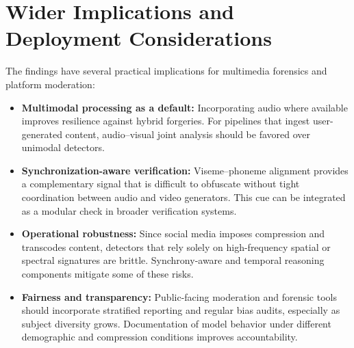 \section{Wider Implications and Deployment Considerations}
The findings have several practical implications for multimedia forensics and platform moderation:
\begin{itemize}
    \item \textbf{Multimodal processing as a default:} Incorporating audio where available improves resilience against hybrid forgeries. For pipelines that ingest user-generated content, audio--visual joint analysis should be favored over unimodal detectors.
    \item \textbf{Synchronization-aware verification:} Viseme--phoneme alignment provides a complementary signal that is difficult to obfuscate without tight coordination between audio and video generators. This cue can be integrated as a modular check in broader verification systems.
    \item \textbf{Operational robustness:} Since social media imposes compression and transcodes content, detectors that rely solely on high-frequency spatial or spectral signatures are brittle. Synchrony-aware and temporal reasoning components mitigate some of these risks.
    \item \textbf{Fairness and transparency:} Public-facing moderation and forensic tools should incorporate stratified reporting and regular bias audits, especially as subject diversity grows. Documentation of model behavior under different demographic and compression conditions improves accountability.
\end{itemize}

